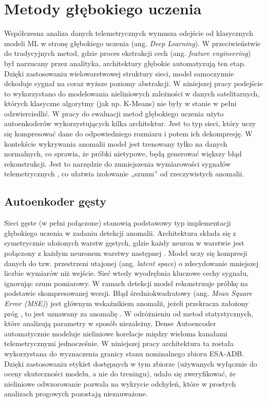 \documentclass[a4paper,twoside,12pt]{book}
\begin{document}
	\section{Metody głębokiego uczenia}
	Współczesna analiza danych telemetrycznych wymusza odejście od klasycznych modeli ML w stronę głębokiego uczenia (ang. \textit{Deep Learning}). W przeciwieństwie do tradycyjnych metod, gdzie proces ekstrakcji cech (ang. \textit{feature engineering}) był narzucany przez analityka, architektury głębokie automatyzują ten etap. Dzięki zastosowaniu wielowarstwowej struktury sieci, model samoczynnie dekoduje sygnał na coraz wyższe poziomy abstrakcji. W niniejszej pracy podejście to wykorzystano do modelowania nieliniowych zależności w danych satelitarnych, których klasyczne algorytmy (jak np. K-Means) nie były w stanie w pełni odzwierciedlić.
	W pracy do ewaluacji metod głębokiego uczenia użyto autoenkoderów wykorzystujących kilka architektur. Jest to typ sieci, który uczy się kompresować dane do odpowiedniego rozmiaru i potem ich dekompresję. W kontekście wykrywania anomalii model jest trenowany tylko na danych normalnych, co sprawia, że próbki nietypowe, będą generować większy błąd rekonstrukcji. Jest to narzędzie do  zmniejszenia wymiarowości sygnałów telemetrycznych , co ułatwia izolowanie „szumu” od rzeczywistych anomalii. 
	
	
	\subsection{Autoenkoder gęsty}
	Sieci gęste (w pełni połączone) stanowią podstawowy typ implementacji głębokiego uczenia w zadaniu detekcji anomalii. Architektura składa się z symetrycznie ułożonych warstw gęstych, gdzie każdy neuron w warstwie jest połączony z każdym neuronem warstwy następnej \cite{liu2018dense}. Model uczy się kompresji danych do tzw. przestrzeni utajonej (ang. \textit{latent space}) o zdecydowanie mniejszej liczbie wymiarów niż wejście. Sieć wtedy wyodrębnia kluczowe cechy sygnału, ignorując szum pomiarowy\cite{liu2018dense}. W ramach detekcji model rekonstruuje próbkę na podstawie skompresowanej wersji. Błąd średniokwadratowy (ang. \textit{Mean Square Error (MSE)}) jest głównym wskaźnikiem anomalii, jeżeli przekracza założony próg , to jest uznawany za anomalię \cite{cao2016hybrid}. 
	W odróżnieniu od metod statystycznych, które analizują parametry w sposób niezależny, Dense Autoencoder automatycznie modeluje nieliniowe korelacje między wieloma kanałami telemetrycznymi jednocześnie. W niniejszej pracy architektura ta została wykorzystana do wyznaczenia granicy stanu nominalnego zbioru ESA-ADB. Dzięki zastosowaniu etykiet dostępnych w tym zbiorze (używanych wyłącznie do oceny skuteczności modelu, a nie do treningu), udało się zweryfikować, że nieliniowe odwzorowanie pozwala na wykrycie odchyleń, które w prostych analizach progowych pozostają niezauważone.
	
\end{document}
